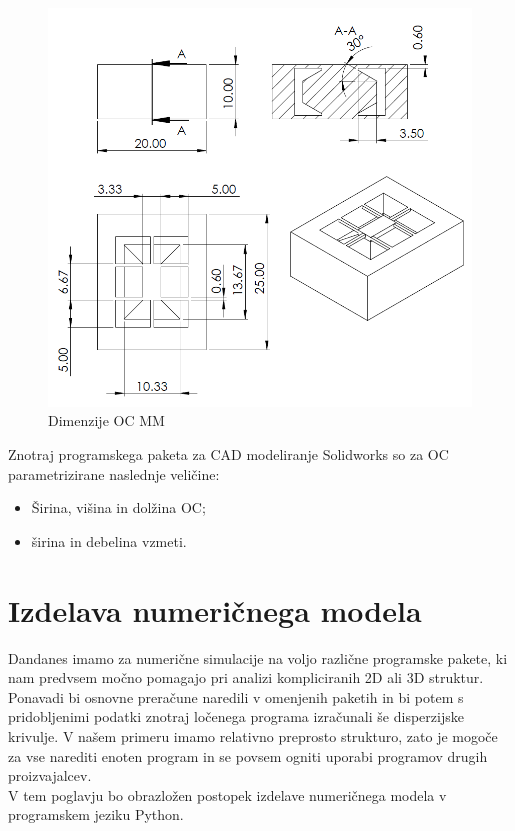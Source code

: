 \documentclass[12pt]{report}
\begin{document}
\begin{figure}[H]
  \centering
  \includegraphics[scale=0.8]{Images/drawing.png}
  \caption{Dimenzije \ac{OC} \ac{MM}}
\end{figure}
Znotraj programskega paketa za CAD modeliranje Solidworks so za \ac{OC} parametrizirane naslednje veličine:
\begin{itemize}
  \item Širina, višina in dolžina \ac{OC};
  \item širina in debelina vzmeti.
\end{itemize}

\section{Izdelava numeričnega modela}
Dandanes imamo za numerične simulacije na voljo različne programske pakete, ki nam predvsem močno pomagajo pri analizi kompliciranih 2D ali 3D struktur. Ponavadi bi osnovne preračune naredili
v omenjenih paketih in bi potem s pridobljenimi podatki znotraj ločenega programa izračunali še disperzijske krivulje.
V našem primeru imamo relativno preprosto strukturo, zato je mogoče za vse narediti enoten program in se povsem ogniti uporabi programov drugih proizvajalcev.
\\
V tem poglavju bo obrazložen postopek izdelave numeričnega modela v programskem jeziku Python.
\end{document}
